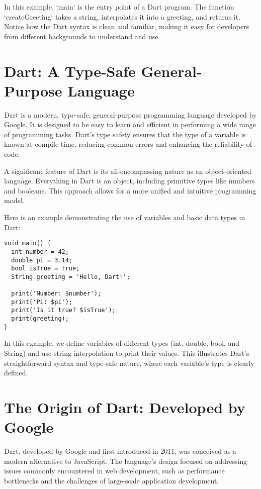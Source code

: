 \documentclass{book}
\begin{document}
In this example, `main` is the entry point of a Dart program. The function `createGreeting` takes a string, interpolates it into a greeting, and returns it. Notice how the Dart syntax is clean and familiar, making it easy for developers from different backgrounds to understand and use.



\chapter{Dart: A Type-Safe General-Purpose Language}

Dart is a modern, type-safe, general-purpose programming language developed by Google. It is designed to be easy to learn and efficient in performing a wide range of programming tasks. Dart's type safety ensures that the type of a variable is known at compile time, reducing common errors and enhancing the reliability of code.

A significant feature of Dart is its all-encompassing nature as an object-oriented language. Everything in Dart is an object, including primitive types like numbers and booleans. This approach allows for a more unified and intuitive programming model.

Here is an example demonstrating the use of variables and basic data types in Dart:

\begin{lstlisting}[style=dartstyle]
void main() {
  int number = 42;
  double pi = 3.14;
  bool isTrue = true;
  String greeting = 'Hello, Dart!';

  print('Number: $number');
  print('Pi: $pi');
  print('Is it true? $isTrue');
  print(greeting);
}
\end{lstlisting}

In this example, we define variables of different types (int, double, bool, and String) and use string interpolation to print their values. This illustrates Dart's straightforward syntax and type-safe nature, where each variable's type is clearly defined.



\chapter{The Origin of Dart: Developed by Google}

Dart, developed by Google and first introduced in 2011, was conceived as a modern alternative to JavaScript. The language's design focused on addressing issues commonly encountered in web development, such as performance bottlenecks and the challenges of large-scale application development. 
\end{document}
